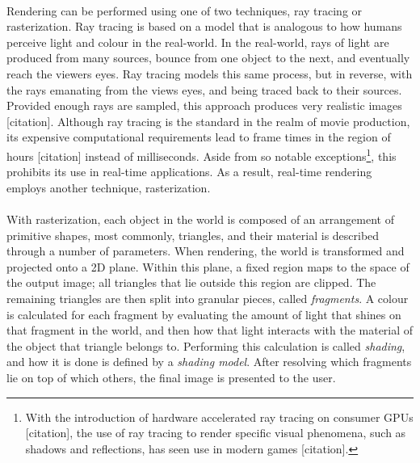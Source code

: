 \paragraph{}Rendering can be performed using one of two techniques, ray tracing or rasterization. Ray tracing is based on a model that is analogous to how humans perceive light and colour in the real-world. In the real-world, rays of light are produced from many sources, bounce from one object to the next, and eventually reach the viewers eyes. Ray tracing models this same process, but in reverse, with the rays emanating from the views eyes, and being traced back to their sources. Provided enough rays are sampled, this approach produces very realistic images [citation]. Although ray tracing is the standard in the realm of movie production, its expensive computational requirements lead to frame times in the region of hours [citation] instead of milliseconds. Aside from so notable exceptions\footnote{With the introduction of hardware accelerated ray tracing on consumer GPUs [citation], the use of ray tracing to render specific visual phenomena, such as shadows and reflections, has seen use in modern games [citation].}, this prohibits its use in real-time applications. As a result, real-time rendering employs another technique, rasterization.

\paragraph{}With rasterization, each object in the world is composed of an arrangement of primitive shapes, most commonly, triangles, and their material is described through a number of parameters. When rendering, the world is transformed and projected onto a 2D plane. Within this plane, a fixed region maps to the space of the output image; all triangles that lie outside this region are clipped. The remaining triangles are then split into granular pieces, called \textit{fragments}. A colour is calculated for each fragment by evaluating the amount of light that shines on that fragment in the world, and then how that light interacts with the material of the object that triangle belongs to. Performing this calculation is called \textit{shading}, and how it is done is defined by a \textit{shading model}. After resolving which fragments lie on top of which others, the final image is presented to the user.

